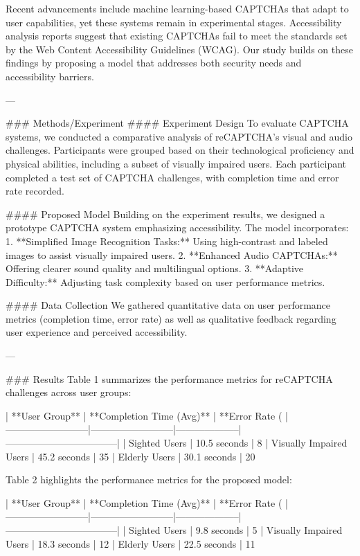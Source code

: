 Recent advancements include machine learning-based CAPTCHAs that adapt to user capabilities, yet these systems remain in experimental stages. Accessibility analysis reports suggest that existing CAPTCHAs fail to meet the standards set by the Web Content Accessibility Guidelines (WCAG). Our study builds on these findings by proposing a model that addresses both security needs and accessibility barriers.

---

### Methods/Experiment  
#### Experiment Design  
To evaluate CAPTCHA systems, we conducted a comparative analysis of reCAPTCHA's visual and audio challenges. Participants were grouped based on their technological proficiency and physical abilities, including a subset of visually impaired users. Each participant completed a test set of CAPTCHA challenges, with completion time and error rate recorded.

#### Proposed Model  
Building on the experiment results, we designed a prototype CAPTCHA system emphasizing accessibility. The model incorporates:  
1. **Simplified Image Recognition Tasks:** Using high-contrast and labeled images to assist visually impaired users.  
2. **Enhanced Audio CAPTCHAs:** Offering clearer sound quality and multilingual options.  
3. **Adaptive Difficulty:** Adjusting task complexity based on user performance metrics.

#### Data Collection  
We gathered quantitative data on user performance metrics (completion time, error rate) as well as qualitative feedback regarding user experience and perceived accessibility.

---

### Results  
Table 1 summarizes the performance metrics for reCAPTCHA challenges across user groups:

| **User Group**          | **Completion Time (Avg)** | **Error Rate (%
|--------------------------|--------------------------|--------------------|-----------------------------------|
| Sighted Users            | 10.5 seconds             | 8%
| Visually Impaired Users  | 45.2 seconds             | 35%
| Elderly Users            | 30.1 seconds             | 20%

Table 2 highlights the performance metrics for the proposed model:

| **User Group**          | **Completion Time (Avg)** | **Error Rate (%
|--------------------------|--------------------------|--------------------|-----------------------------------|
| Sighted Users            | 9.8 seconds              | 5%
| Visually Impaired Users  | 18.3 seconds             | 12%
| Elderly Users            | 22.5 seconds             | 11%


